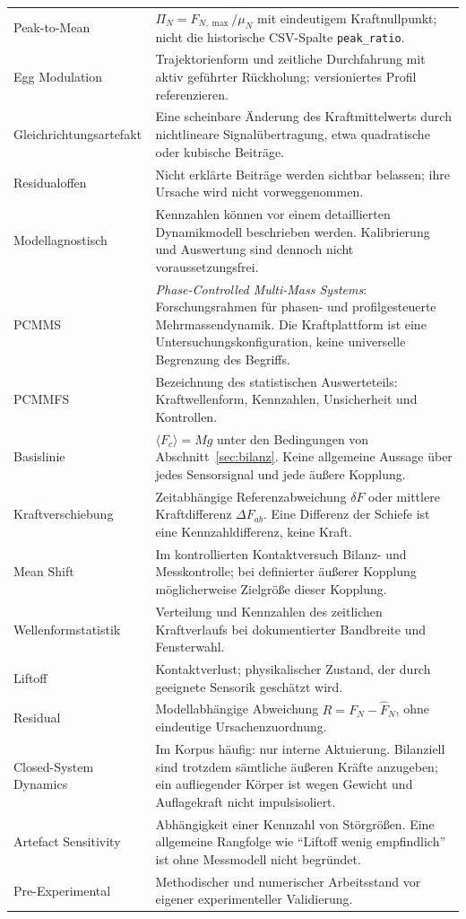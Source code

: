 \documentclass[11pt,a4paper]{article}
\newcommand{\PCMMS}{\textit{Phase-Controlled Multi-Mass Systems}}
\begin{document}
\begin{longtable}{@{}L{.29\textwidth}L{.68\textwidth}@{}}
Peak-to-Mean&$\Pi_N=F_{N,\max}/\mu_N$ mit eindeutigem Kraftnullpunkt; nicht die historische CSV-Spalte \texttt{peak\_ratio}.\\
Egg Modulation&Trajektorienform und zeitliche Durchfahrung mit aktiv geführter Rückholung; versioniertes Profil referenzieren.\\
Gleichrichtungsartefakt&Eine scheinbare Änderung des Kraftmittelwerts durch nichtlineare Signalübertragung, etwa quadratische oder kubische Beiträge.\\
Residualoffen&Nicht erklärte Beiträge werden sichtbar belassen; ihre Ursache wird nicht vorweggenommen.\\
Modellagnostisch&Kennzahlen können vor einem detaillierten Dynamikmodell beschrieben werden. Kalibrierung und Auswertung sind dennoch nicht voraussetzungsfrei.\\
PCMMS&\PCMMS: Forschungsrahmen für phasen- und profilgesteuerte Mehrmassendynamik. Die Kraftplattform ist eine Untersuchungskonfiguration, keine universelle Begrenzung des Begriffs.\\
PCMMFS&Bezeichnung des statistischen Auswerteteils: Kraftwellenform, Kennzahlen, Unsicherheit und Kontrollen.\\
Basislinie&$\langle F_c\rangle=Mg$ unter den Bedingungen von Abschnitt~\ref{sec:bilanz}. Keine allgemeine Aussage über jedes Sensorsignal und jede äußere Kopplung.\\
Kraftverschiebung&Zeitabhängige Referenzabweichung $\delta F$ oder mittlere Kraftdifferenz $\Delta F_{ab}$. Eine Differenz der Schiefe ist eine Kennzahldifferenz, keine Kraft.\\
Mean Shift&Im kontrollierten Kontaktversuch Bilanz- und Messkontrolle; bei definierter äußerer Kopplung möglicherweise Zielgröße dieser Kopplung.\\
Wellenformstatistik&Verteilung und Kennzahlen des zeitlichen Kraftverlaufs bei dokumentierter Bandbreite und Fensterwahl.\\
Liftoff&Kontaktverlust; physikalischer Zustand, der durch geeignete Sensorik geschätzt wird.\\
Residual&Modellabhängige Abweichung $R=F_N-\hat F_N$, ohne eindeutige Ursachenzuordnung.\\
Closed-System Dynamics&Im Korpus häufig: nur interne Aktuierung. Bilanziell sind trotzdem sämtliche äußeren Kräfte anzugeben; ein aufliegender Körper ist wegen Gewicht und Auflagekraft nicht impulsisoliert.\\
Artefact Sensitivity&Abhängigkeit einer Kennzahl von Störgrößen. Eine allgemeine Rangfolge wie ``Liftoff wenig empfindlich'' ist ohne Messmodell nicht begründet.\\
Pre-Experimental&Methodischer und numerischer Arbeitsstand vor eigener experimenteller Validierung.\\
\bottomrule\end{longtable}
\end{document}
